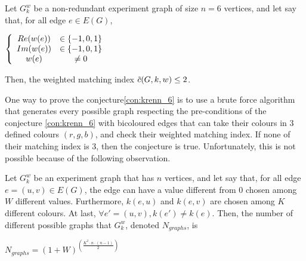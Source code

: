 \begin{conjecture}
    \label{con:krenn_6}
    Let $G_k^w$ be a non-redundant experiment graph of size $n = 6$ vertices, and let say that, for all edge $e \in E(G)$,
    \begin{center}
        $\left\{\begin{array}{c c}
                    Re(w(e)) & \in \{-1, 0, 1\} \\
                    Im(w(e)) & \in \{-1, 0, 1\} \\
                    w(e)     & \neq 0          \\
        \end{array}\right.$
    \end{center}
    Then, the weighted matching index $\Tilde{c}(G, k, w) \leq 2$.
\end{conjecture}

One way to prove the conjecture\ref{con:krenn_6} is to use a brute force algorithm that generates every possible graph respecting the pre-conditions of the conjecture \ref{con:krenn_6} with bicoloured edges that can take their colours in $3$ defined colours $(r, g, b)$, and check their weighted matching index.
If none of their matching index is $3$, then the conjecture is true.
Unfortunately, this is not possible because of the following observation.\\

\begin{observation}
    Let $G_k^w$ be an experiment graph that has $n$ vertices, and let say that, for all edge $e = (u, v) \in E(G)$, the edge can have a value different from $0$ chosen among $W$ different values.
    Furthermore, $k(e, u)$ and $k(e, v)$ are chosen among $K$ different colours.
    At last, $\forall e' = (u, v), k(e') \neq k(e)$.
    Then, the number of different possible graphs that $G_k^w$, denoted $N_{graphs}$, is

    \begin{center}
        $N_{graphs} = (1 + W)^{\left(\frac{K^2 \cdot n \cdot (n-1)}{2}\right)}$
    \end{center}
\end{observation}


